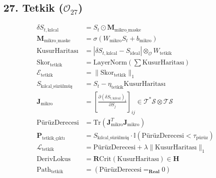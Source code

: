\documentclass[11pt, a4paper]{article}
\begin{document}
\subsection{27. Tetkik ($\mathcal{O}_{27}$)}
\begin{align}
\delta S_{t, \text{kılcal}} &= S_t \odot \mathbf{M}_{\text{mikro\_maske}} \\
\mathbf{M}_{\text{mikro\_maske}} &= \sigma(W_{\text{mikro}} S_t + b_{\text{mikro}}) \\
\text{KusurHaritası} &= |\delta S_{t, \text{kılcal}} - S_{\text{ideal}}| \otimes_{\mathcal{O}} W_{\text{tetkik}} \\
\text{Skor}_{\text{tetkik}} &= \text{LayerNorm}\left( \sum \text{KusurHaritası} \right) \\
\mathcal{E}_{\text{tetkik}} &= \| \text{Skor}_{\text{tetkik}} \|_1 \\
S_{\text{kılcal\_süzülmüş}} &= S_t - \eta_{\text{tetkik}} \text{KusurHaritası} \\
\mathbf{J}_{\text{mikro}} &= \left[ \frac{\partial (\delta S_{t, \text{kılcal}})_i}{\partial S_j} \right]_{ij} \in \mathcal{T}^*\mathcal{S} \otimes \mathcal{T}\mathcal{S} \\
\text{PürüzDerecesi} &= \text{Tr}(\mathbf{J}_{\text{mikro}}^T \mathbf{J}_{\text{mikro}}) \\
\mathbf{P}_{\text{tetkik\_çıktı}} &= S_{\text{kılcal\_süzülmüş}} \cdot \mathbb{I}(\text{PürüzDerecesi} < \tau_{\text{pürüz}}) \\
\mathcal{L}_{\text{tetkik}} &= \text{PürüzDerecesi} + \lambda \| \text{KusurHaritası} \|_1 \\
\text{DerivLokus} &= \mathbf{R}\text{Crit}(\text{KusurHaritası}) \in \mathbf{H} \\
\text{Path}_{\text{tetkik}} &= (\text{PürüzDerecesi} =_{\mathbf{Real}} 0)
\end{align}
\end{document}
